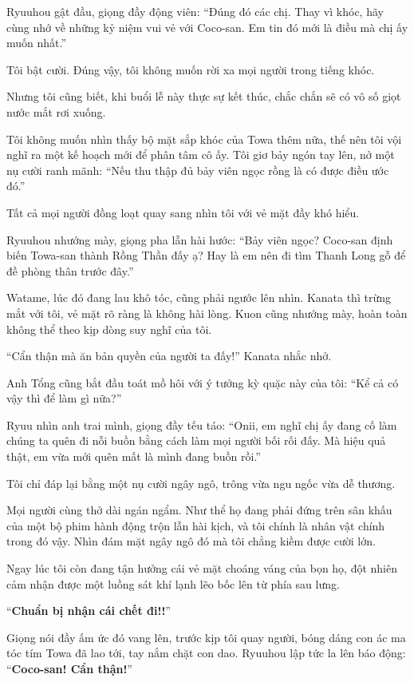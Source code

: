\documentclass[../main.tex]{subfiles}
\begin{document}
Ryuuhou gật đầu, giọng đầy động viên: ``Đúng đó các chị. Thay vì khóc, hãy cùng nhớ về những kỷ niệm vui vẻ với Coco-san. Em tin đó mới là điều mà chị ấy muốn nhất.''

Tôi bật cười. Đúng vậy, tôi không muốn rời xa mọi người trong tiếng khóc.

Nhưng tôi cũng biết, khi buổi lễ này thực sự kết thúc, chắc chắn sẽ có vô số giọt nước mắt rơi xuống.

Tôi không muốn nhìn thấy bộ mặt sắp khóc của Towa thêm nữa, thế nên tôi vội nghĩ ra một kế hoạch mới để phân tâm cô ấy. Tôi giơ bảy ngón tay lên, nở một nụ cười ranh mãnh: ``Nếu thu thập đủ bảy viên ngọc rồng là có được điều ước đó.''

Tất cả mọi người đồng loạt quay sang nhìn tôi với vẻ mặt đầy khó hiểu.

Ryuuhou nhướng mày, giọng pha lẫn hài hước: ``Bảy viên ngọc? Coco-san định biến Towa-san thành Rồng Thần đấy ạ? Hay là em nên đi tìm Thanh Long gỗ để đề phòng thân trước đây.''

Watame, lúc đó đang lau khô tóc, cũng phải ngước lên nhìn. Kanata thì trừng mắt với tôi, vẻ mặt rõ ràng là không hài lòng. Kuon cũng nhướng mày, hoàn toàn không thể theo kịp dòng suy nghĩ của tôi.

``Cẩn thận mà ăn bản quyền của người ta đấy!'' Kanata nhắc nhở.

Anh Tổng cũng bắt đầu toát mồ hôi với ý tưởng kỳ quặc này của tôi: ``Kể cả có vậy thì để làm gì nữa?''

Ryuu nhìn anh trai mình, giọng đầy tếu táo: ``Onii, em nghĩ chị ấy đang cố làm chúng ta quên đi nỗi buồn bằng cách làm mọi người bối rối đấy. Mà hiệu quả thật, em vừa mới quên mất là mình đang buồn rồi.''

Tôi chỉ đáp lại bằng một nụ cười ngây ngô, trông vừa ngu ngốc vừa dễ thương.

Mọi người cùng thở dài ngán ngẩm. Như thể họ đang phải đứng trên sân khấu của một bộ phim hành động trộn lẫn hài kịch, và tôi chính là nhân vật chính trong đó vậy. Nhìn đám mặt ngây ngô đó mà tôi chẳng kiềm được cười lớn.

Ngay lúc tôi còn đang tận hưởng cái vẻ mặt choáng váng của bọn họ, đột nhiên cảm nhận được một luồng sát khí lạnh lẽo bốc lên từ phía sau lưng.

``\textbf{Chuẩn bị nhận cái chết đi!!}''


Giọng nói đầy ấm ức đó vang lên, trước kịp tôi quay người, bóng dáng con ác ma tóc tím Towa đã lao tới, tay nắm chặt con dao. Ryuuhou lập tức la lên báo động: ``\textbf{Coco-san! Cẩn thận!}''
\end{document}
